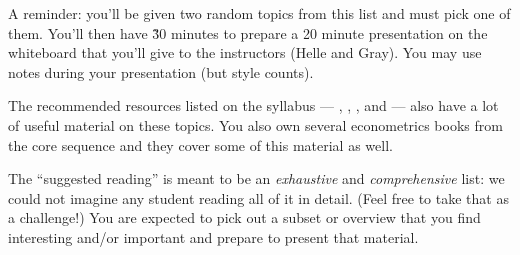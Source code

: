 \documentclass[nofonts,nols]{tufte-handout}
\begin{document}
\begin{fullwidth}
\noindent%
A reminder: you'll be given two random topics from this list and must
pick one of them. You'll then have \~30 minutes to prepare a 20 minute
presentation on the whiteboard that you'll give to the instructors
(Helle and Gray). You may use notes during your presentation (but
style counts).

The recommended resources listed on the syllabus --- \citep{Lu06},
\citep{Ca07}, \citep{MS08}, and \citep{SW08} --- also have a lot of
useful material on these topics. You also own several econometrics
books from the core sequence and they cover some of this material as
well.

The ``suggested reading'' is meant to be an \emph{exhaustive} and
\emph{comprehensive} list: we could not imagine any student reading
all of it in detail. (Feel free to take that as a challenge!) You are
expected to pick out a subset or overview that you find interesting
and/or important and prepare to present that material.
\end{fullwidth}



\end{document}
